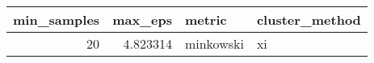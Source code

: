 \begin{tabular}{rrll}
\toprule
min_samples & max_eps & metric & cluster_method \\
\midrule
20 & 4.823314 & minkowski & xi \\
\bottomrule
\end{tabular}
